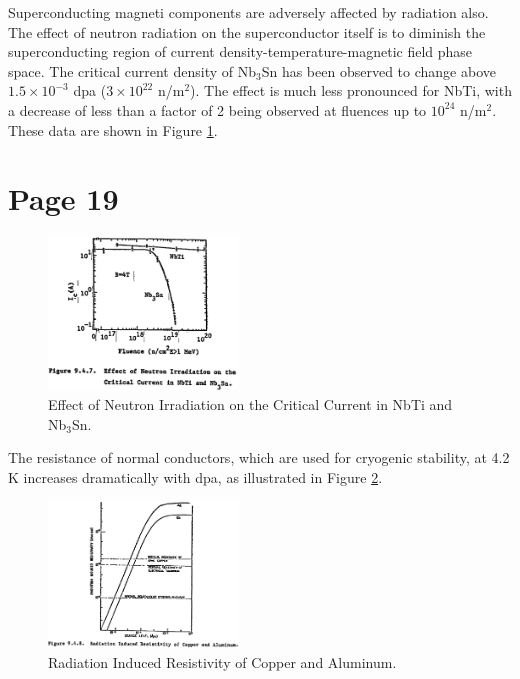 \documentclass[11pt]{report} %
\begin{document}
Superconducting magneti components are adversely affected by radiation also. The effect of neutron radiation on the superconductor itself is to diminish the superconducting region of current density-temperature-magnetic field phase space. The critical current density of Nb$_3$Sn has been observed to change above ~$1.5\times 10^{-3}$ dpa ($3\times 10^{22}$ n/m$^2$). The effect is much less pronounced for NbTi, with a decrease of less than a factor of 2 being observed at fluences up to $10^{24}$ n/m$^2$. These data are shown in Figure \ref{fig:irradiationEffect}.

\section{Page 19}

\begin{figure}[H]
  \centering
  \includegraphics[width=0.45\textwidth]{figs/irradiationEffect.png}
  \caption{Effect of Neutron Irradiation on the Critical Current in NbTi and Nb$_3$Sn.}
  \label{fig:irradiationEffect}
\end{figure}

The resistance of normal conductors, which are used for cryogenic stability, at 4.2 K increases dramatically with dpa, as illustrated in Figure \ref{fig:resistivity}.

\begin{figure}[H]
  \centering
  \includegraphics[width=0.45\textwidth]{figs/resistivity.png}
  \caption{Radiation Induced Resistivity of Copper and Aluminum.}
  \label{fig:resistivity}
\end{figure}
\end{document}
